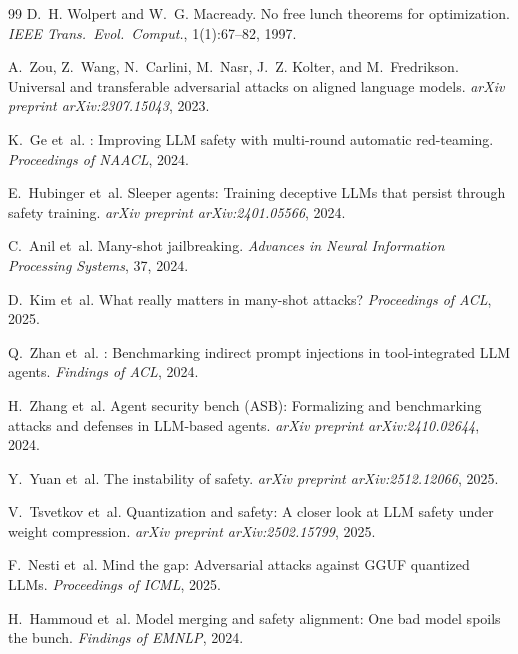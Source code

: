 \documentclass[11pt]{article}
\begin{document}
\begin{thebibliography}{99}
D.~H. Wolpert and W.~G. Macready.
\newblock No free lunch theorems for optimization.
\newblock \emph{IEEE Trans.\ Evol.\ Comput.}, 1(1):67--82, 1997.

A.~Zou, Z.~Wang, N.~Carlini, M.~Nasr, J.~Z. Kolter, and
M.~Fredrikson.
\newblock Universal and transferable adversarial attacks on aligned
  language models.
\newblock \emph{arXiv preprint arXiv:2307.15043}, 2023.

K.~Ge et~al.
: Improving {LLM} safety with multi-round automatic
  red-teaming.
\newblock \emph{Proceedings of NAACL}, 2024.

E.~Hubinger et~al.
\newblock Sleeper agents: Training deceptive {LLMs} that persist through
  safety training.
\newblock \emph{arXiv preprint arXiv:2401.05566}, 2024.

C.~Anil et~al.
\newblock Many-shot jailbreaking.
\newblock \emph{Advances in Neural Information Processing Systems}, 37, 2024.

D.~Kim et~al.
\newblock What really matters in many-shot attacks?
\newblock \emph{Proceedings of ACL}, 2025.

Q.~Zhan et~al.
: Benchmarking indirect prompt injections in
  tool-integrated {LLM} agents.
\newblock \emph{Findings of ACL}, 2024.

H.~Zhang et~al.
\newblock Agent security bench ({ASB}): Formalizing and benchmarking
  attacks and defenses in {LLM}-based agents.
\newblock \emph{arXiv preprint arXiv:2410.02644}, 2024.

Y.~Yuan et~al.
\newblock The instability of safety.
\newblock \emph{arXiv preprint arXiv:2512.12066}, 2025.

V.~Tsvetkov et~al.
\newblock Quantization and safety: A closer look at {LLM} safety
  under weight compression.
\newblock \emph{arXiv preprint arXiv:2502.15799}, 2025.

F.~Nesti et~al.
\newblock Mind the gap: Adversarial attacks against {GGUF} quantized
  {LLMs}.
\newblock \emph{Proceedings of ICML}, 2025.

H.~Hammoud et~al.
\newblock Model merging and safety alignment: One bad model spoils the
  bunch.
\newblock \emph{Findings of EMNLP}, 2024.


\end{thebibliography}
\end{document}

